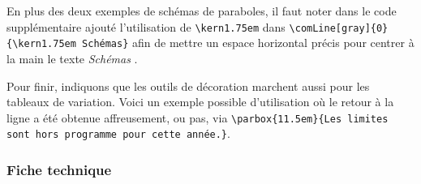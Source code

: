 \documentclass[12pt,a4paper]{article}
\newcommand\ee{e}
\begin{document}
En plus des deux exemples de schémas de paraboles, il faut noter dans le code supplémentaire ajouté l'utilisation de \verb#\kern1.75em# dans \verb#\comLine[gray]{0}{\kern1.75em Schémas}# afin de mettre un espace horizontal précis pour centrer à la main le texte \emph{\og Schémas \fg}.

\medskip

\begin{latexex-alone}
\end{latexex-alone}




 \label{grapgsign-com-two-lines}

Pour finir, indiquons que les outils de décoration marchent aussi pour les tableaux de variation.
Voici un exemple possible d'utilisation où le retour à la ligne a été obtenue affreusement, ou pas, via \verb#\parbox{11.5em}{Les limites sont hors programme pour cette année.}#.

\begin{center}
\end{center}




\subsubsection{Fiche technique}
\end{document}
